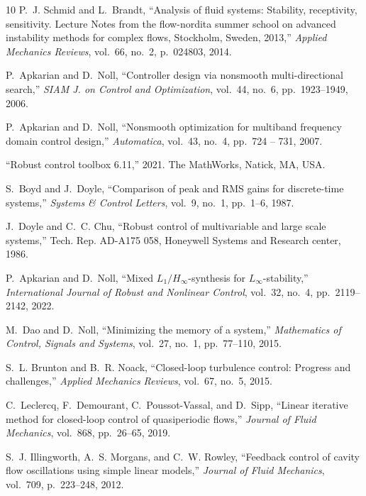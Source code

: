 \documentclass[12pt, a4paper,reqno]{amsart}
\theoremstyle{definition}
\begin{document}
\begin{thebibliography}{10}
P.~J. Schmid and L.~Brandt, ``Analysis of fluid systems: Stability,
  receptivity, sensitivity. {L}ecture {N}otes from the flow-nordita summer
  school on advanced instability methods for complex flows, {S}tockholm,
  {S}weden, 2013,'' {\em Applied Mechanics Reviews}, vol.~66, no.~2, p.~024803,
  2014.

P.~Apkarian and D.~Noll, ``Controller design via nonsmooth multi-directional
  search,'' {\em SIAM J. on Control and Optimization}, vol.~44, no.~6,
  pp.~1923--1949, 2006.

P.~Apkarian and D.~Noll, ``Nonsmooth optimization for multiband frequency
  domain control design,'' {\em Automatica}, vol.~43, no.~4, pp.~724 -- 731,
  2007.

``Robust control toolbox 6.11,'' 2021.
\newblock The MathWorks, Natick, MA, USA.

S.~Boyd and J.~Doyle, ``Comparison of peak and {RMS} gains for discrete-time
  systems,'' {\em Systems \& Control Letters}, vol.~9, no.~1, pp.~1--6, 1987.

J.~Doyle and C.~C. Chu, ``Robust control of multivariable and large scale
  systems,'' Tech. Rep. AD-A175 058, Honeywell Systems and Research center,
  1986.

P.~Apkarian and D.~Noll, ``Mixed {$L_1/H_\infty$}-synthesis for
  {$L_\infty$}-stability,'' {\em International Journal of Robust and Nonlinear
  Control}, vol.~32, no.~4, pp.~2119--2142, 2022.

M.~Dao and D.~Noll, ``Minimizing the memory of a system,'' {\em Mathematics of
  Control, Signals and Systems}, vol.~27, no.~1, pp.~77--110, 2015.

S.~L. Brunton and B.~R. Noack, ``Closed-loop turbulence control: Progress and
  challenges,'' {\em Applied Mechanics Reviews}, vol.~67, no.~5, 2015.

C.~Leclercq, F.~Demourant, C.~Poussot-Vassal, and D.~Sipp, ``Linear iterative
  method for closed-loop control of quasiperiodic flows,'' {\em Journal of
  Fluid Mechanics}, vol.~868, pp.~26--65, 2019.

S.~J. Illingworth, A.~S. Morgans, and C.~W. Rowley, ``Feedback control of
  cavity flow oscillations using simple linear models,'' {\em Journal of Fluid
  Mechanics}, vol.~709, p.~223–248, 2012.


\end{thebibliography}
\end{document}
